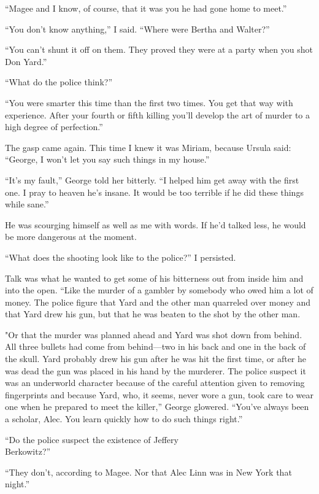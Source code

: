 \documentclass{novel}
\begin{document}
“Magee and I know, of course, that it was you he had gone home to meet.”

“You don’t know anything,” I said. “Where were Bertha and Walter?”

“You can’t shunt it off on them. They proved they were at a party when you shot Don Yard.”

“What do the police think?”

“You were smarter this time than the first two times. You get that way with experience. After your fourth or fifth killing you’ll develop the art of murder to a high degree of perfection.”

\scenestars

The gasp came again. This time I knew it was Miriam, because Ursula said: “George, I won’t let you say such things in my house.”

“It’s my fault,” George told her bitterly. “I helped him get away with the first one. I pray to heaven he’s insane. It would be too terrible if he did these things while sane.”

He was scourging himself as well as me with words. If he’d talked less, he would be more dangerous at the moment.

“What does the shooting look like to the police?” I persisted.

Talk was what he wanted to get some of his bitterness out from inside him and into the open. “Like the murder of a gambler by somebody who owed him a lot of money. The police figure that Yard and the other man quarreled over money and that Yard drew his gun, but that he was beaten to the shot by the other man.

"Or that the murder was planned ahead and Yard was shot down from behind. All three bullets had come from behind—two in his back and one in the back of the skull. Yard probably drew his gun after he was hit the first time, or after he was dead the gun was placed in his hand by the murderer. The police suspect it was an underworld character because of the careful attention given to removing fingerprints and because Yard, who, it seems, never wore a gun, took care to wear one when he prepared to meet the killer,” George glowered. “You’ve always been a scholar, Alec. You learn quickly how to do such things right.”

“Do the police suspect the existence of Jeffery\\Berkowitz?”

“They don’t, according to Magee. Nor that Alec Linn was in New York that night.”
\end{document}
